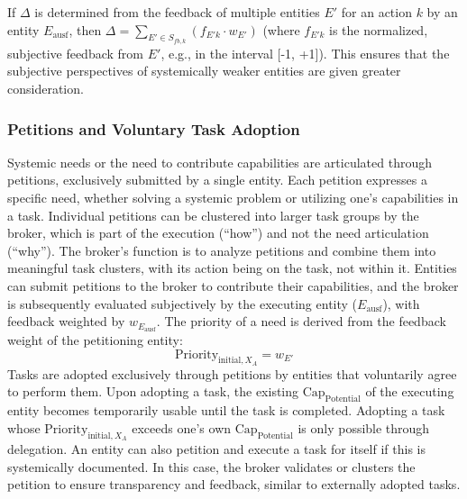 \documentclass[12pt]{scrartcl}
\begin{document}

If $\Delta$ is determined from the feedback of multiple entities $E'$ for an action $k$ by an entity $E_{\text{ausf}}$, then $\Delta = \sum_{E' \in S_{fb,k}} (f_{E'k} \cdot w_{E'})$ (where $f_{E'k}$ is the normalized, subjective feedback from $E'$, e.g., in the interval [-1, +1]). This ensures that the subjective perspectives of systemically weaker entities are given greater consideration.

\subsubsection{Petitions and Voluntary Task Adoption}
\label{sec:PetitionenFinal}
Systemic needs or the need to contribute capabilities are articulated through petitions, exclusively submitted by a single entity. Each petition expresses a specific need, whether solving a systemic problem or utilizing one’s capabilities in a task. Individual petitions can be clustered into larger task groups by the broker, which is part of the execution (“how”) and not the need articulation (“why”). The broker’s function is to analyze petitions and combine them into meaningful task clusters, with its action being on the task, not within it. Entities can submit petitions to the broker to contribute their capabilities, and the broker is subsequently evaluated subjectively by the executing entity ($E_{\text{ausf}}$), with feedback weighted by $w_{E_{\text{ausf}}}$. The priority of a need is derived from the feedback weight of the petitioning entity:
\begin{equation}
\text{Priority}_{\text{initial}, X_A} = w_{E'}
\label{eq:PetitionPrioritätFinal}
\end{equation}
Tasks are adopted exclusively through petitions by entities that voluntarily agree to perform them. Upon adopting a task, the existing $\text{Cap}_{\text{Potential}}$ of the executing entity becomes temporarily usable until the task is completed. Adopting a task whose $\text{Priority}_{\text{initial}, X_A}$ exceeds one’s own $\text{Cap}_{\text{Potential}}$ is only possible through delegation. An entity can also petition and execute a task for itself if this is systemically documented. In this case, the broker validates or clusters the petition to ensure transparency and feedback, similar to externally adopted tasks.
\end{document}

